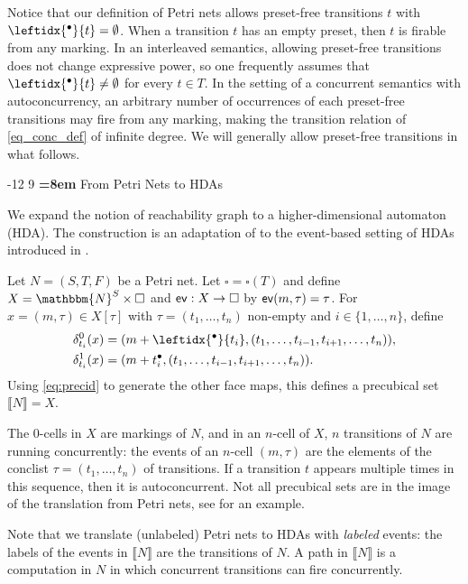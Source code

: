 \documentclass[runningheads,envcountsame]{llncs}
\makeatletter
\newcommand*\ev{\textup{\textsf{ev}}}
\newcommand*\Nat{\mathbbm{N}}
\newcommand*\prepla[1]{\leftidx{^\bullet}{#1}}
\newcommand*\pospla[1]{#1^\bullet}
\newcommand*\sem[1]{\llbracket #1\rrbracket}
\renewcommand\section{\@startsection{section}{1}{\z@}%
  {-12\p@ \@plus -3\p@ \@minus -3\p@}%
  {9\p@ \@plus 3\p@ \@minus 3\p@}%
  {\normalfont\large\bfseries\boldmath
    \rightskip=\z@ \@plus 8em\pretolerance=10000 }}
\makeatother
\begin{document}
Notice that our definition of Petri nets allows preset-free transitions $t$ with $\prepla{t}=\emptyset$. When a transition $t$ has an empty preset,  then $t$ is firable from any marking. In an interleaved semantics, allowing preset-free transitions does not change expressive power,
so one frequently assumes that $\prepla{t} \neq \emptyset$ for every $t\in T$.   In the setting of a concurrent semantics with autoconcurrency, an arbitrary number of occurrences of each preset-free transitions may fire from any marking, making the transition relation of \eqref{eq_conc_def} of infinite degree.
We will generally allow preset-free transitions in what follows.

\section{From Petri Nets to HDAs}
\label{sec:pn2hda}

We expand the notion of reachability graph to a higher-dimensional automaton (HDA).
The construction is an adaptation of \cite[Def.~9]{DBLP:journals/tcs/Glabbeek06}
to the event-based setting of HDAs introduced in \cite{Hdalang}.

Let $N=(S, T, F)$ be a Petri net.
Let $\square=\square(T)$
and define $X=\Nat^S\times \square$
and $\ev: X\to \square$ by $\ev(m, \tau)=\tau$.
For $x=(m, \tau)\in X[\tau]$ with $\tau=(t_1,\dotsc, t_n)$ non-empty and $i\in\{1,\dotsc, n\}$, define
\begin{align*}
  \delta_{t_i}^0(x) &= (m+\prepla{t_i}, (t_1,\dotsc, t_{i-1}, t_{i+1},\dotsc, t_n)), \\
  \delta_{t_i}^1(x) &= (m+\pospla{t_i}, (t_1,\dotsc, t_{i-1}, t_{i+1},\dotsc, t_n)).
\end{align*}
Using \eqref{eq:precid} to generate the other face maps,
this defines a precubical set $\sem{N}=X$.

The $0$-cells in $X$ are markings of $N$,
and in an $n$-cell of $X$, $n$ transitions of $N$ are running concurrently:
the events of an $n$-cell $(m, \tau)$ are the elements of the conclist $\tau=(t_1,\dotsc, t_n)$ of transitions.
If a transition $t$ appears multiple times in this sequence, then it is autoconcurrent.
Not all precubical sets are in the image of the translation from Petri nets,
see \cite[Fig.~11]{DBLP:journals/tcs/Glabbeek06} for an example.

Note that we translate (unlabeled) Petri nets to HDAs with \emph{labeled} events:
the labels of the events in $\sem{N}$ are the transitions of $N$.
A path in $\sem{N}$ is a computation in $N$ in which concurrent transitions can fire concurrently.
\end{document}
